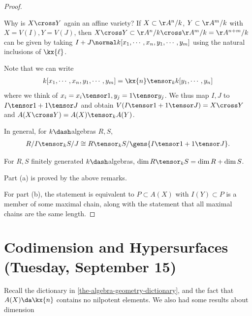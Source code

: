\begin{proof}

\begin{remark}

Why is \(X\cross Y\) again an affine variety? If \(X\subset \AA^n/k\),
\(Y\subset \AA^m/k\) with \(X = V(I), Y = V(J)\), then
\(X\cross Y \subset \AA^n/k \cross \AA^m/k = \AA^{n+m}/k\) can be given
by taking \(I+J \normal k[x_1, \cdots, x_n, y_1, \cdots, y_m]\) using
the natural inclusions of \(\kx{\ell}\).

Note that we can write
\begin{align*}  
k[x_1, \cdots, x_n, y_1, \cdots, y_m] = \kx{n} \tensor_k k[y_1, \cdots, y_n]
\end{align*} where we think of
\(x_i = x_i \tensor 1, y_j = 1 \tensor y_j\). We thus map \(I, J\) to
\(I\tensor 1 + 1\tensor J\) and obtain
\(V(I\tensor 1 + 1\tensor J) = X\cross Y\) and
\(A(X\cross Y) = A(X)\tensor_k A(Y)\).

In general, for \(k\dash\)algebras \(R,S\),
\begin{align*}  
R/I \tensor_k S/J \cong R\tensor_k S / \gens{I\tensor 1 + 1\tensor J}
.\end{align*}

\end{remark}

\begin{remark}

For \(R,S\) finitely generated \(k\dash\)algebras,
\(\dim R\tensor_k S = \dim R + \dim S\).

\end{remark}

Part (a) is proved by the above remarks.

For part (b), the statement is equivalent to \(P\subset A(X)\) with
\(I(Y) \subset P\) is a member of some maximal chain, along with the
statement that all maximal chains are the same length.

\end{proof}

\hypertarget{codimension-and-hypersurfaces-tuesday-september-15}{%
\section{Codimension and Hypersurfaces (Tuesday, September
15)}\label{codimension-and-hypersurfaces-tuesday-september-15}}

Recall the dictionary in \cref{the-algebra-geometry-dictionary}, and the
fact that \(A(X) \da \kx{n}\) contains no nilpotent elements. We also
had some results about dimension

